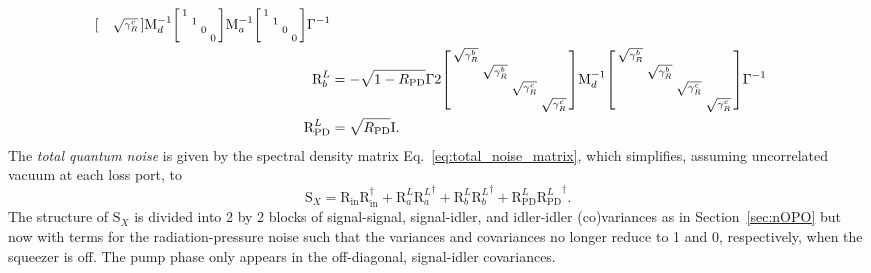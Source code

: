 \begin{align}
\begin{bsmallmatrix}
 &  &  & \sqrt{\gamma^c_R}
\end{bsmallmatrix}\text{M}_d^{-1}\begin{bsmallmatrix}
1 &  &  &  \\
 & 1 &  &  \\
 &  & 0 &  \\
 &  &  & 0
\end{bsmallmatrix}\text{M}_a^{-1}\begin{bsmallmatrix}
1 &  &  &  \\
 & 1 &  &  \\
 &  & 0 &  \\
 &  &  & 0
\end{bsmallmatrix}\Gamma^{-1}\\
\text{R}^L_b&=-\sqrt{1-R_\text{PD}}\Gamma 2\begin{bsmallmatrix}
\sqrt{\gamma^b_R} &  &  &  \\
 & \sqrt{\gamma^b_R} &  &  \\
 &  & \sqrt{\gamma^c_R} &  \\
 &  &  & \sqrt{\gamma^c_R}
\end{bsmallmatrix}\text{M}_d^{-1}\begin{bsmallmatrix}
\sqrt{\gamma^b_R} &  &  &  \\
 & \sqrt{\gamma^b_R} &  &  \\
 &  & \sqrt{\gamma^c_R} &  \\
 &  &  & \sqrt{\gamma^c_R}
\end{bsmallmatrix}\Gamma^{-1}\\
\text{R}^L_\text{PD}&=\sqrt{R_\text{PD}} \text{I}.
\end{align}
\endgroup
The \emph{total quantum noise} is given by the spectral density matrix Eq.~\ref{eq:total_noise_matrix}, which simplifies, assuming uncorrelated vacuum at each loss port, to
\begin{equation}\label{eq:nIS_Sx}
\text{S}_X=\text{R}_\text{in}\text{R}_\text{in}^\dag+\text{R}^L_a{\text{R}^L_a}^\dag+\text{R}^L_b{\text{R}^L_b}^\dag+\text{R}^L_\text{PD}{\text{R}^L_\text{PD}}^\dag.
\end{equation} %
The structure of $\text{S}_X$ is divided into 2 by 2 blocks of signal-signal, signal-idler, and idler-idler (co)variances as in Section~\ref{sec:nOPO} but now with terms for the radiation-pressure noise such that the variances and covariances no longer reduce to 1 and 0, respectively, when the squeezer is off. The pump phase only appears in the off-diagonal, signal-idler covariances.

